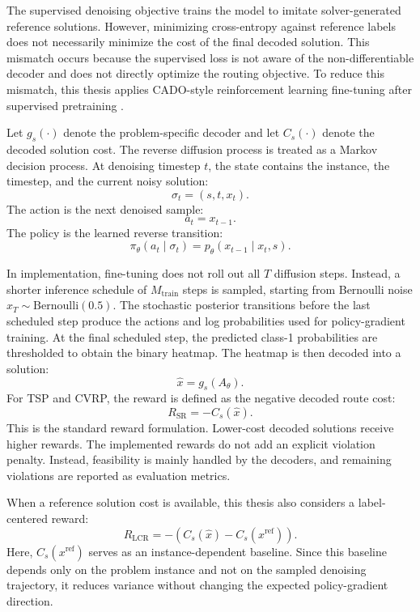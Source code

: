 The supervised denoising objective trains the model to imitate solver-generated reference solutions. However, minimizing cross-entropy against reference labels does not necessarily minimize the cost of the final decoded solution. This mismatch occurs because the supervised loss is not aware of the non-differentiable decoder and does not directly optimize the routing objective. To reduce this mismatch, this thesis applies CADO-style reinforcement learning fine-tuning after supervised pretraining \citep{yoon2024cado}.

Let \(g_s(\cdot)\) denote the problem-specific decoder and let \(C_s(\cdot)\) denote the decoded solution cost. The reverse diffusion process is treated as a Markov decision process. At denoising timestep \(t\), the state contains the instance, the timestep, and the current noisy solution:
\[
    \sigma_t = (s,t,x_t).
\]
The action is the next denoised sample:
\[
    a_t = x_{t-1}.
\]
The policy is the learned reverse transition:
\[
    \pi_\theta(a_t \mid \sigma_t)
    =
    p_\theta(x_{t-1} \mid x_t,s).
\]

In implementation, fine-tuning does not roll out all \(T\) diffusion steps. Instead, a shorter inference schedule of \(M_{\mathrm{train}}\) steps is sampled, starting from Bernoulli noise \(x_T \sim \mathrm{Bernoulli}(0.5)\). The stochastic posterior transitions before the last scheduled step produce the actions and log probabilities used for policy-gradient training. At the final scheduled step, the predicted class-1 probabilities are thresholded to obtain the binary heatmap. The heatmap is then decoded into a solution:
\[
    \hat{x}
    =
    g_s(A_\theta).
\]
For TSP and CVRP, the reward is defined as the negative decoded route cost:
\[
    R_{\mathrm{SR}}
    =
    -C_s(\hat{x}).
\]
This is the standard reward formulation. Lower-cost decoded solutions receive higher rewards. The implemented rewards do not add an explicit violation penalty. Instead, feasibility is mainly handled by the decoders, and remaining violations are reported as evaluation metrics.

When a reference solution cost is available, this thesis also considers a label-centered reward:
\[
    R_{\mathrm{LCR}}
    =
    -
    \left(
        C_s(\hat{x}) - C_s(x^{\mathrm{ref}})
    \right).
\]
Here, \(C_s(x^{\mathrm{ref}})\) serves as an instance-dependent baseline. Since this baseline depends only on the problem instance and not on the sampled denoising trajectory, it reduces variance without changing the expected policy-gradient direction.

